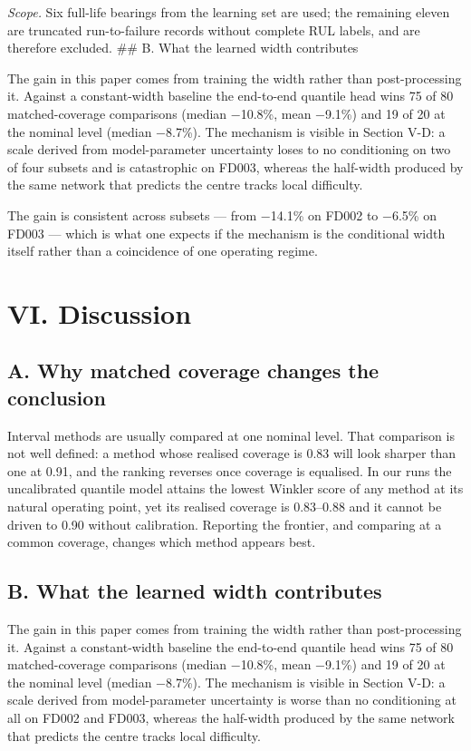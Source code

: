 ﻿\documentclass[journal]{IEEEtran}
\begin{document}
\emph{Scope.} Six full-life bearings from the learning set are used; the remaining eleven are truncated run-to-failure records without complete RUL labels, and are therefore excluded.
\#\# B. What the learned width contributes

The gain in this paper comes from training the width rather than post-processing it. Against a constant-width baseline the end-to-end quantile head wins 75 of 80 matched-coverage comparisons (median −10.8\%, mean −9.1\%) and 19 of 20 at the nominal level (median −8.7\%). The mechanism is visible in Section V-D: a scale derived from model-parameter uncertainty loses to no conditioning on two of four subsets and is catastrophic on FD003, whereas the half-width produced by the same network that predicts the centre tracks local difficulty.

The gain is consistent across subsets --- from −14.1\% on FD002 to −6.5\% on FD003 --- which is what one expects if the mechanism is the conditional width itself rather than a coincidence of one operating regime.

\section{VI. Discussion}\label{vi.-discussion}

\subsection{A. Why matched coverage changes the conclusion}\label{a.-why-matched-coverage-changes-the-conclusion}

Interval methods are usually compared at one nominal level. That comparison is not well defined: a method whose realised coverage is 0.83 will look sharper than one at 0.91, and the ranking reverses once coverage is equalised. In our runs the uncalibrated quantile model attains the lowest Winkler score of any method at its natural operating point, yet its realised coverage is 0.83--0.88 and it cannot be driven to 0.90 without calibration. Reporting the frontier, and comparing at a common coverage, changes which method appears best.

\subsection{B. What the learned width contributes}\label{b.-what-the-learned-width-contributes}

The gain in this paper comes from training the width rather than post-processing it. Against a constant-width baseline the end-to-end quantile head wins 75 of 80 matched-coverage comparisons (median −10.8\%, mean −9.1\%) and 19 of 20 at the nominal level (median −8.7\%). The mechanism is visible in Section V-D: a scale derived from model-parameter uncertainty is worse than no conditioning at all on FD002 and FD003, whereas the half-width produced by the same network that predicts the centre tracks local difficulty.
\end{document}
